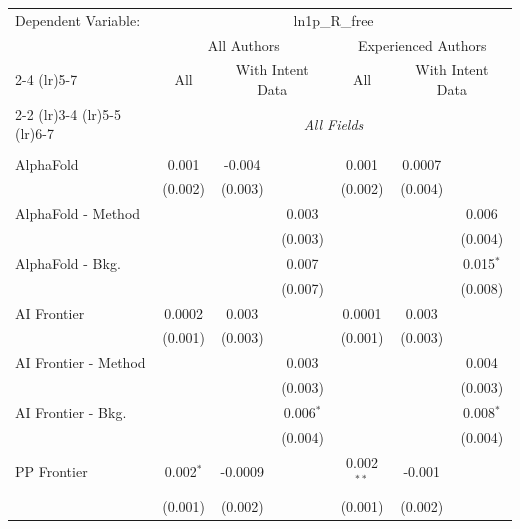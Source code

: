 \begingroup
\centering
\begin{tabular}{lcccccc}
   \tabularnewline \midrule \midrule
   Dependent Variable: & \multicolumn{6}{c}{ln1p\_R\_free}\\
 & \multicolumn{3}{c}{All Authors} & \multicolumn{3}{c}{Experienced Authors} \\
\cmidrule(lr){2-4} \cmidrule(lr){5-7}
 & \multicolumn{1}{c}{All} & \multicolumn{2}{c}{With Intent Data} & \multicolumn{1}{c}{All} & \multicolumn{2}{c}{With Intent Data} \\
\cmidrule(lr){2-2} \cmidrule(lr){3-4} \cmidrule(lr){5-5} \cmidrule(lr){6-7}
 & \multicolumn{6}{c}{\textit{All Fields}} \\ \\
   AlphaFold            & 0.001       & -0.004  &             & 0.001        & 0.0007  &   \\   
                        & (0.002)     & (0.003) &             & (0.002)      & (0.004) &   \\   
   AlphaFold - Method   &             &         & 0.003       &              &         & 0.006\\   
                        &             &         & (0.003)     &              &         & (0.004)\\   
   AlphaFold - Bkg.     &             &         & 0.007       &              &         & 0.015$^{*}$\\   
                        &             &         & (0.007)     &              &         & (0.008)\\   
   AI Frontier          & 0.0002      & 0.003   &             & 0.0001       & 0.003   &   \\   
                        & (0.001)     & (0.003) &             & (0.001)      & (0.003) &   \\   
   AI Frontier - Method &             &         & 0.003       &              &         & 0.004\\   
                        &             &         & (0.003)     &              &         & (0.003)\\   
   AI Frontier - Bkg.   &             &         & 0.006$^{*}$ &              &         & 0.008$^{*}$\\   
                        &             &         & (0.004)     &              &         & (0.004)\\   
   PP Frontier          & 0.002$^{*}$ & -0.0009 &             & 0.002$^{**}$ & -0.001  &   \\   
                        & (0.001)     & (0.002) &             & (0.001)      & (0.002) &   \\   

\end{tabular}
